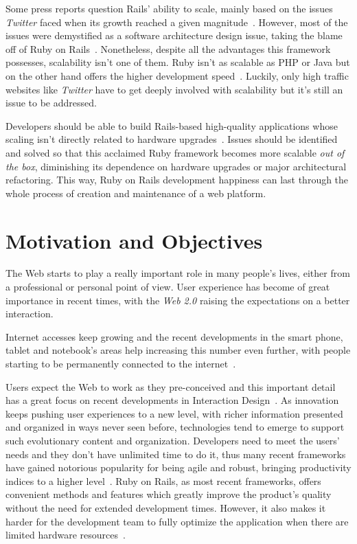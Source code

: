 Some press reports question Rails' ability to scale, mainly based on the issues \textit{Twitter} faced when its growth reached a given magnitude~\cite{interview_alex_payne}. However, most of the issues were demystified as a software architecture design issue, taking the blame off of Ruby on Rails~\cite{ror_ecosystem_whitepaper}. Nonetheless, despite all the advantages this framework possesses, scalability isn't one of them. Ruby isn't as scalable as PHP or Java but on the other hand offers the higher development speed~\cite{issues_web_frameworks}. Luckily, only high traffic websites like \textit{Twitter} have to get deeply involved with scalability but it's still an issue to be addressed.

Developers should be able to build Rails-based high-quality applications whose scaling isn't directly related to hardware upgrades~\cite{interview_alex_payne}. Issues should be identified and solved so that this acclaimed Ruby framework becomes more scalable \textit{out of the box}, diminishing its dependence on hardware upgrades or major architectural refactoring. This way, Ruby on Rails development happiness can last through the whole process of creation and maintenance of a web platform.


\section{Motivation and Objectives} %
\label{sec:motivation_and_objectives}
The Web starts to play a really important role in many people's lives, either from a professional or personal point of view. User experience has become of great importance in recent times, with the \textit{Web 2.0} raising the expectations on a better interaction.

Internet accesses keep growing and the recent developments in the smart phone, tablet and notebook's areas help increasing this number even further, with people starting to be permanently connected to the internet~\cite{npd:3g,mobileweb,netbooks}.

Users expect the Web to work as they pre-conceived and this important detail has a great focus on recent developments in Interaction Design~\cite{interaction_design}. As innovation keeps pushing user experiences to a new level, with richer information presented and organized in ways never seen before, technologies tend to emerge to support such evolutionary content and organization. Developers need to meet the users' needs and they don't have unlimited time to do it, thus many recent frameworks have gained notorious popularity for being agile and robust, bringing productivity indices to a higher level~\cite{trends_webdev}. Ruby on Rails, as most recent frameworks, offers convenient methods and features which greatly improve the product's quality without the need for extended development times. However, it also makes it harder for the development team to fully optimize the application when there are limited hardware resources~\cite{look_common_performance_problems_rails}.


